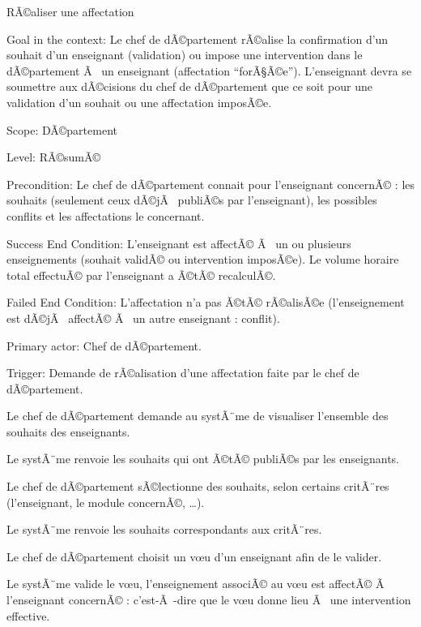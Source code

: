 \documentclass[a4paper, french, 10pt]{report}
\begin{document}
\begin{usecase}{RÃ©aliser une affectation}

\begin{information}

\item[Goal in the context:]
Le chef de dÃ©partement rÃ©alise la confirmation d'un souhait d'un enseignant (validation) ou impose une intervention dans le dÃ©partement Ã  un enseignant (affectation ``forÃ§Ã©e''). L'enseignant devra se soumettre aux dÃ©cisions du chef de dÃ©partement que ce soit pour une validation d'un souhait ou une affectation imposÃ©e.

\item[Scope:]
DÃ©partement

\item[Level:]
RÃ©sumÃ©

\item[Precondition:]
Le chef de dÃ©partement connait pour l'enseignant concernÃ© : les souhaits (seulement ceux dÃ©jÃ  publiÃ©s par l'enseignant), les possibles conflits et les affectations le concernant.

\item[Success End Condition:]
L'enseignant est affectÃ© Ã  un ou plusieurs enseignements (souhait validÃ© ou intervention imposÃ©e). Le volume horaire total effectuÃ© par l'enseignant a Ã©tÃ© recalculÃ©.

\item[Failed End Condition:]
L'affectation n'a pas Ã©tÃ© rÃ©alisÃ©e (l'enseignement est dÃ©jÃ  affectÃ© Ã  un autre enseignant : conflit).

\item[Primary actor:]
Chef de dÃ©partement.

\item[Trigger:]
Demande de rÃ©alisation d'une affectation faite par le chef de dÃ©partement.\\

\end{information}

\begin{scenario}
\item Le chef de dÃ©partement demande au systÃ¨me de visualiser l'ensemble des souhaits des enseignants.
\item Le systÃ¨me renvoie les souhaits qui ont Ã©tÃ© publiÃ©s par les enseignants.
\item Le chef de dÃ©partement sÃ©lectionne des souhaits, selon certains critÃ¨res (l'enseignant, le module concernÃ©, \dots).
\item Le systÃ¨me renvoie les souhaits correspondants aux critÃ¨res.  
\item Le chef de dÃ©partement choisit un v\oe u d'un enseignant afin de le valider.
\item Le systÃ¨me valide le v\oe u, l'enseignement associÃ© au v\oe u est affectÃ© Ã  l'enseignant concernÃ© : c'est-Ã -dire que le v\oe u donne lieu Ã  une intervention effective.\\
\end{scenario}


\end{usecase}
\end{document}
